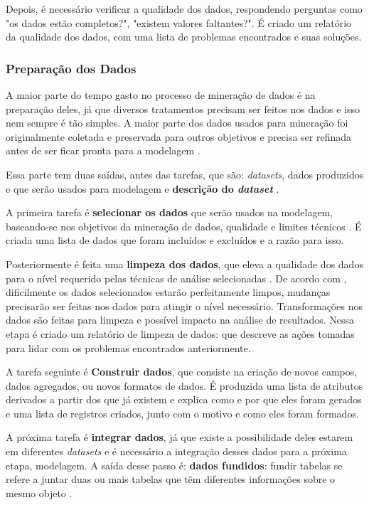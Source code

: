 Depois, é necessário verificar a qualidade dos dados, respondendo perguntas como "os dados estão completos?", "existem valores faltantes?". É criado um relatório da qualidade dos dados, com uma lista de problemas encontrados e suas soluções.

\subsubsection{Preparação dos Dados}
A maior parte do tempo gasto no processo de mineração de dados é na preparação deles, já que diversos tratamentos precisam ser feitos nos dados e isso nem sempre é tão simples. A maior parte dos dados usados para mineração foi originalmente coletada e preservada para outros objetivos e precisa ser refinada antes de ser ficar pronta para a modelagem \citep{dmfd}.

Essa parte tem duas saídas, antes das tarefas, que são: \textit{datasets}, dados produzidos e que serão usados para modelagem e \textbf{descrição do \textit{dataset}} \citep{crispmanual}.

A primeira tarefa é \textbf{selecionar os dados} que serão usados na modelagem, baseando-se nos objetivos da mineração de dados, qualidade e limites técnicos \citep{crispmanual}. É criada uma lista de dados que foram incluídos e excluídos e a razão para isso.

Posteriormente é feita uma \textbf{limpeza dos dados}, que eleva a qualidade dos dados para o nível requerido pelas técnicas de análise selecionadas \citep{crispmanual}. De acordo com , dificilmente os dados selecionados estarão perfeitamente limpos, mudanças precisarão ser feitas nos dados para atingir o nível necessário. Transformações nos dados são feitas para limpeza e possível impacto na análise de resultados. Nessa etapa é criado um relatório de limpeza de dados: que descreve as ações tomadas para lidar com os problemas encontrados anteriormente.

A tarefa seguinte é \textbf{Construir dados}, que consiste na criação de novos campos, dados agregados, ou novos formatos de dados. É produzida uma lista de atributos derivados a partir dos que já existem e explica como e por que eles foram gerados e uma lista de registros criados, junto com o motivo e como eles foram formados.

A próxima tarefa é \textbf{integrar dados}, já que existe a possibilidade deles estarem em diferentes \textit{datasets} e é necessário a integração desses dados para a próxima etapa, modelagem. A saída desse passo é: \textbf{dados fundidos}: fundir tabelas se refere a juntar duas ou mais tabelas que têm diferentes informações sobre o mesmo objeto \citep{crispmanual}. 

